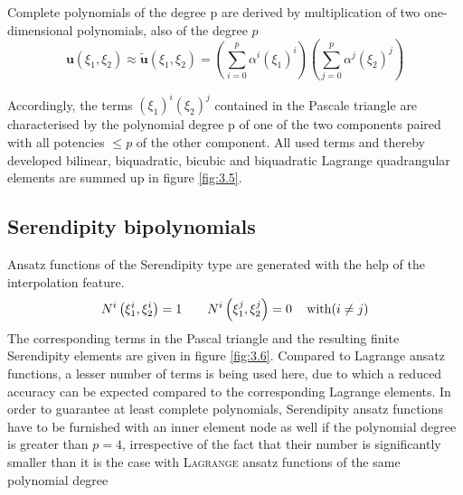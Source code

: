 Complete polynomials of the degree p are derived by multiplication of two one-dimensional
polynomials, also of the degree $p$
\begin{equation}
\label{eqn:3.31}
 \boldsymbol{u}\left(\xi_{1}, \xi_{2}\right) \approx \tilde{\boldsymbol{u}}\left(\xi_{1}, \xi_{2}\right)=\left(\sum_{i=0}^{p} \alpha^{i}\left(\xi_{1}\right)^{i}\right)\left(\sum_{j=0}^{p} \alpha^{j}\left(\xi_{2}\right)^{j}\right) 
\end{equation}

Accordingly, the terms $(\xi_1)^i (\xi_2 )^j$ contained in the Pascale triangle are characterised by the
polynomial degree p of one of the two components paired with all potencies $\le p$ of the other
component. All used terms and thereby developed bilinear, biquadratic, bicubic and biquadratic
Lagrange quadrangular elements are summed up in figure \ref{fig:3.5}. 

\subsection{Serendipity bipolynomials}
Ansatz functions of the Serendipity type are generated with the help of the interpolation feature.
\begin{equation}
    {N^i}\left( {\xi _1^i,\xi _2^i} \right) = 1\qquad {N^i}\left( {\xi _1^j,\xi _2^j} \right) = 0\,\quad {\rm{with }}(i \ne j{\rm{ }})
\end{equation}
The corresponding terms in the Pascal triangle and the resulting finite Serendipity elements are
given in figure \ref{fig:3.6}. Compared to Lagrange ansatz functions, a lesser number of terms is being
used here, due to which a reduced accuracy can be expected compared to the corresponding
Lagrange elements. In order to guarantee at least complete polynomials, Serendipity ansatz
functions have to be furnished with an inner element node as well if the polynomial degree is
greater than $p = 4$, irrespective of the fact that their number is significantly smaller than it is
the case with \textsc{Lagrange} ansatz functions of the same polynomial degree